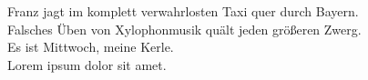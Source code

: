 Franz jagt im komplett verwahrlosten Taxi quer durch Bayern.
\\
Falsches Üben von Xylophonmusik quält jeden größeren Zwerg.
\\
Es ist Mittwoch, meine Kerle.
\\
Lorem ipsum dolor sit amet.
